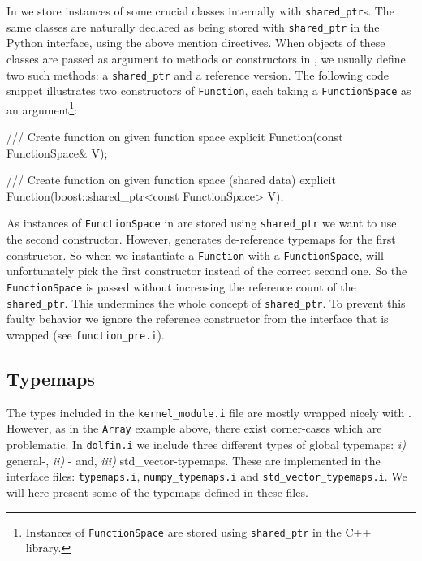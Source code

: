 In \dolfin we store instances of some crucial classes internally with \texttt{shared\_ptr}s. The same classes are naturally declared as being stored with \texttt{shared\_ptr} in the Python interface, using the above mention directives. When objects of these classes are passed as argument to methods or constructors in \dolfin, we usually define two such methods: a \texttt{shared\_ptr} and a reference version. The following code snippet illustrates two constructors of \texttt{Function}, each taking a \texttt{FunctionSpace} as an argument\footnote{Instances of \texttt{FunctionSpace} are stored using \texttt{shared\_ptr} in the \dolfin C++ library.}:
\begin{c++}
/// Create function on given function space
explicit Function(const FunctionSpace& V);

/// Create function on given function space (shared data)
explicit Function(boost::shared_ptr<const FunctionSpace> V);
\end{c++}
As instances of \texttt{FunctionSpace} in \pydolfin are stored using \texttt{shared\_ptr} we want \swig to use the second constructor. However, \swig generates de-reference typemaps for the first constructor. So when we instantiate a \texttt{Function} with a \texttt{FunctionSpace}, \swig will unfortunately pick the first constructor instead of the correct second one. So the \texttt{FunctionSpace} is passed without increasing the reference count of the \texttt{shared\_ptr}. This undermines the whole concept of \texttt{shared\_ptr}. To prevent this faulty behavior we ignore the reference constructor from the interface that is wrapped (see \texttt{function\_pre.i}).
\begin{c++}
\end{c++}

\subsection{Typemaps}
The types included in the \texttt{kernel\_module.i} file are mostly wrapped nicely with \swig. However, as in the \texttt{Array} example above, there exist corner-cases which are problematic. In \texttt{dolfin.i} we include three different types of global typemaps: \textit{i)} general-, \textit{ii)} \numpy- and, \textit{iii)} std\_vector-typemaps. These are implemented in the interface files: \texttt{typemaps.i}, \texttt{numpy\_}\texttt{typemaps.i} and \texttt{std\_}\texttt{vector\_}\texttt{typemaps.i}. We will here present some of the typemaps defined in these files.\par

